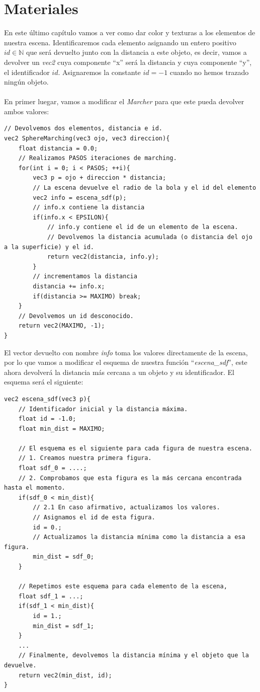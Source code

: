 \chapter{Materiales}
En este último capítulo vamos a ver como dar color y texturas a los elementos de nuestra escena. Identificaremos cada elemento asignando un entero positivo \(id \in \mathbb{N}\) que será devuelto junto con la distancia a este objeto, es decir, vamos a devolver un \textit{vec2} cuya componente \enquote{x} será la distancia y cuya componente \enquote{y}, el identificador \(id\). Asignaremos la constante \(id=-1\) cuando no hemos trazado ningún objeto.\\\\
En primer luegar, vamos a modificar el \textit{Marcher} para que este pueda devolver ambos valores:

\begin{lstlisting}
// Devolvemos dos elementos, distancia e id.
vec2 SphereMarching(vec3 ojo, vec3 direccion){
    float distancia = 0.0;
    // Realizamos PASOS iteraciones de marching.
    for(int i = 0; i < PASOS; ++i){
        vec3 p = ojo + direccion * distancia;
        // La escena devuelve el radio de la bola y el id del elemento
        vec2 info = escena_sdf(p);
        // info.x contiene la distancia
        if(info.x < EPSILON){
            // info.y contiene el id de un elemento de la escena.
            // Devolvemos la distancia acumulada (o distancia del ojo a la superficie) y el id.
            return vec2(distancia, info.y);
        }
        // incrementamos la distancia
        distancia += info.x;
        if(distancia >= MAXIMO) break;
    }
    // Devolvemos un id desconocido.
    return vec2(MAXIMO, -1);
}
\end{lstlisting}

El vector devuelto con nombre \textit{info} toma los valores directamente de la escena, por lo que vamos a modificar el esquema de nuestra función \enquote{\textit{escena\_sdf}}, este ahora devolverá la distancia más cercana a un objeto y su identificador. El esquema será el siguiente:

\begin{lstlisting}
vec2 escena_sdf(vec3 p){
    // Identificador inicial y la distancia máxima.
    float id = -1.0;
    float min_dist = MAXIMO;
    
    // El esquema es el siguiente para cada figura de nuestra escena.
    // 1. Creamos nuestra primera figura.
    float sdf_0 = ....;
    // 2. Comprobamos que esta figura es la más cercana encontrada hasta el momento.
    if(sdf_0 < min_dist){
        // 2.1 En caso afirmativo, actualizamos los valores.
        // Asignamos el id de esta figura.
        id = 0.;
        // Actualizamos la distancia mínima como la distancia a esa figura.
        min_dist = sdf_0;
    }
    
    // Repetimos este esquema para cada elemento de la escena,
    float sdf_1 = ...;
    if(sdf_1 < min_dist){
        id = 1.;
        min_dist = sdf_1;
    }
    ...
    // Finalmente, devolvemos la distancia mínima y el objeto que la devuelve.
    return vec2(min_dist, id);
}
\end{lstlisting}

